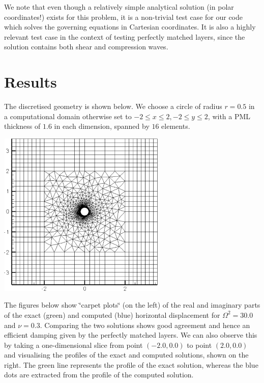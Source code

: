 We note that even though a relatively simple analytical solution (in polar coordinates!) exists for this problem, it is a non-\/trivial test case for our code which solves the governing equations in Cartesian coordinates. It is also a highly relevant test case in the context of testing perfectly matched layers, since the solution contains both shear and compression waves.



 

 \hypertarget{index_results}{}\section{Results}\label{index_results}
The discretised geometry is shown below. We choose a circle of radius $ r=0.5$ in a computational domain otherwise set to $ -2 \le x \le 2, -2 \le y \le 2 $, with a P\+ML thickness of $ 1.6 $ in each dimension, spanned by $ 16 $ elements.

 
\begin{DoxyImage}
\includegraphics[width=0.6\textwidth]{mesh}
\end{DoxyImage}


The figures below show \char`\"{}carpet plots\char`\"{} (on the left) of the real and imaginary parts of the exact (green) and computed (blue) horizontal displacement for $ \Omega^2=30.0 $ and $ \nu=0.3 $. Comparing the two solutions shows good agreement and hence an efficient damping given by the perfectly matched layers. We can also observe this by taking a one-\/dimensional slice from point $ (-2.0,0.0)$ to point $ (2.0,0.0)$ and visualising the profiles of the exact and computed solutions, shown on the right. The green line represents the profile of the exact solution, whereas the blue dots are extracted from the profile of the computed solution.

